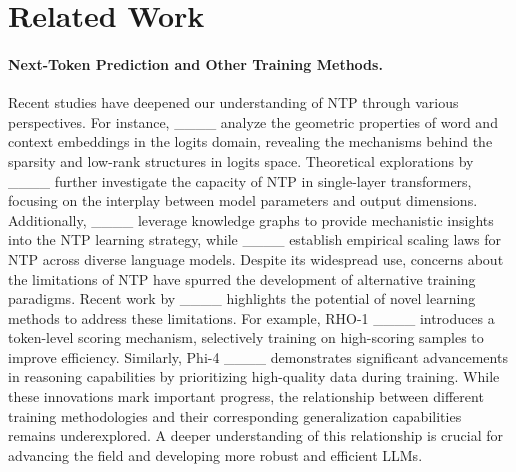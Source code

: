 \section{Related Work}
\paragraph{Next-Token Prediction and Other Training Methods.}
Recent studies have deepened our understanding of NTP through various perspectives. For instance, ____ analyze the geometric properties of word and context embeddings in the logits domain, revealing the mechanisms behind the sparsity and low-rank structures in logits space. Theoretical explorations by ____ further investigate the capacity of NTP in single-layer transformers, focusing on the interplay between model parameters and output dimensions. Additionally, ____ leverage knowledge graphs to provide mechanistic insights into the NTP learning strategy, while ____ establish empirical scaling laws for NTP across diverse language models. Despite its widespread use, concerns about the limitations of NTP have spurred the development of alternative training paradigms. Recent work by ____ highlights the potential of novel learning methods to address these limitations. For example, RHO-1 ____ introduces a token-level scoring mechanism, selectively training on high-scoring samples to improve efficiency. Similarly, Phi-4 ____ demonstrates significant advancements in reasoning capabilities by prioritizing high-quality data during training. While these innovations mark important progress, the relationship between different training methodologies and their corresponding generalization capabilities remains underexplored. A deeper understanding of this relationship is crucial for advancing the field and developing more robust and efficient LLMs.


